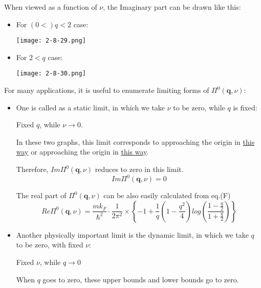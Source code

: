 When viewed as a function of $\nu$, the Imaginary part can be drawn like this:

\begin{itemize}
\item For $(0 < ) q < 2$ case:
\begin{center}\label{Fig2.8.29}
\texttt{[image: 2-8-29.png]}
\end{center}
\item For $2 < q$ case:
\begin{center}\label{Fig2.8.30}
\texttt{[image: 2-8-30.png]}
\end{center}
\end{itemize}

For many applications, it is useful to enumerate limiting forms of $\Pi^0(\mathbf{q},\nu)$:
\begin{itemize}
\item One is called as a static limit, in which we take $\nu$ to be zero, while $q$ is fixed:

\begin{center}Fixed $q$, while $\nu \rightarrow 0$.\end{center}

In these two graphs, this limit corresponds to approaching the origin in \underline{this way} or approaching the origin in \underline{this way}.

Therefore, $Im\Pi^0(\mathbf{q},\nu)$ reduces to zero in this limit.
\begin{equation} \label{Eqs2.8.25.a} \tag{2.8.25.a}
Im\Pi^0(\mathbf{q},\nu) = 0
\end{equation}
\setcounter{equation}{25}

The real part of $\Pi^0(\mathbf{q},\nu)$ can be also easily calculated from eq.(F)
\begin{equation*} \label{Eqs2.8.25.b} \tag{2.8.25.b}
Re\Pi^0(\mathbf{q},\nu) = \frac{m k_F}{\hbar^2}\cdot \frac{1}{2\pi^2} \times \left\{ -1 + \frac{1}{q}(1-\frac{q^2}{4})log\left( \frac{1-\frac{q}{2}}{1+\frac{q}{2}} \right) \right\}
\end{equation*}

\item Another physically important limit is the dynamic limit, in which we take $q$ to be zero, with fixed $\nu$:

\begin{center}Fixed $\nu$, while $q\rightarrow 0$\end{center}

When $q$ goes to zero, these upper bounds and lower bounds go to zero.


\end{itemize}
